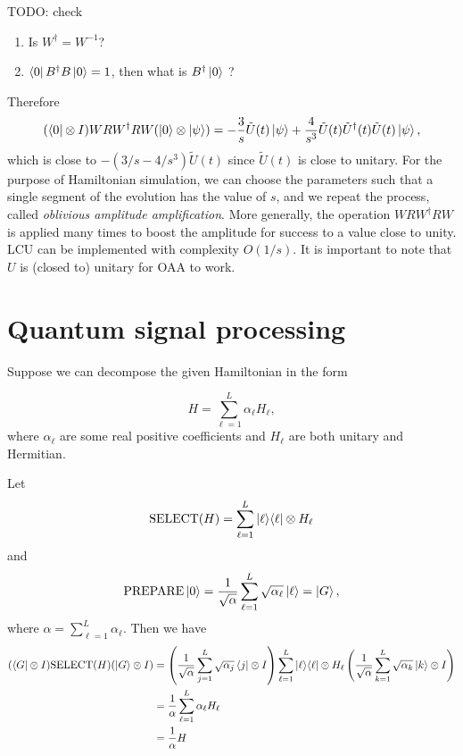 \documentclass[11pt, oneside]{article}   	%
\begin{document}
TODO: check
\begin{enumerate}
\item
Is $W^{\dagger} = W^{-1}$?
\item
$\bra{0} B^{\dagger} B \ket{0} = 1$, then what is $B^{\dagger} \ket{0}$ ?
\end{enumerate}

Therefore
\begin{equation*} 
(\bra{0} \otimes I) W R W^{\dagger} R W (\ket{0} \otimes \ket{\psi}) 
= - \frac{3}{s} \tilde{U}(t) \ket{\psi} + \frac{4}{s^3} \tilde{U}(t) \tilde{U}^{\dagger}(t) \tilde{U}(t) \ket{\psi}, 
\end{equation*}
which is close to $-(3/s - 4/s^3) \tilde{U}(t)$ since $\tilde{U}(t)$ is close to unitary.
For the purpose of Hamiltonian simulation, we can choose the parameters such that a single segment of the evolution has the value of $s$, and we repeat the process, called \textit{oblivious amplitude amplification}. 
More generally, the operation $W R W^{\dagger} R W$ is applied many times to boost the amplitude for success to a value close to unity. 
LCU can be implemented with complexity $O(1/s)$.
It is important to note that $U$ is (closed to) unitary for OAA to work.


\section{Quantum signal processing}
Suppose we can decompose the given Hamiltonian in the form

\begin{equation*} 
H = \sum^L_{\ell = 1} \alpha_{\ell} H_{\ell},
\end{equation*}
where $\alpha_{\ell}$ are some real positive coefficients and $H_{\ell}$ are both unitary and Hermitian.

Let 
\begin{equation*} 
\textrm{SELECT}(H) = \sum^{L}_{\ell = 1} \ket{\ell} \! \bra{\ell} \otimes H_{\ell}
\end{equation*}
and 
\begin{equation*} 
\textrm{PREPARE} \ket{0} = \frac{1}{\sqrt{\alpha}} \sum^{L}_{\ell = 1} \sqrt{\alpha_{\ell}} \ket{\ell} = \ket{G},
\end{equation*}
where $\alpha = \sum^L_{\ell = 1} \alpha_{\ell}$.
Then we have
\begin{align*} 
(\bra{G} \otimes I) \textrm{SELECT}(H) (\ket{G} \otimes I) 
&= \left( \frac{1}{\sqrt{\alpha}} \sum^{L}_{j = 1} \sqrt{\alpha_{j}} \bra{j} \otimes I \right) \sum^{L}_{\ell = 1} \ket{\ell} \! \bra{\ell} \otimes H_{\ell} \left( \frac{1}{\sqrt{\alpha}} \sum^{L}_{k = 1} \sqrt{\alpha_{k}} \ket{k} \otimes I \right) \\
&=  \frac{1}{\alpha} \sum^{L}_{\ell = 1} \alpha_{\ell} H_{\ell} \\
&=  \frac{1}{\alpha} H
\end{align*}
\end{document}
